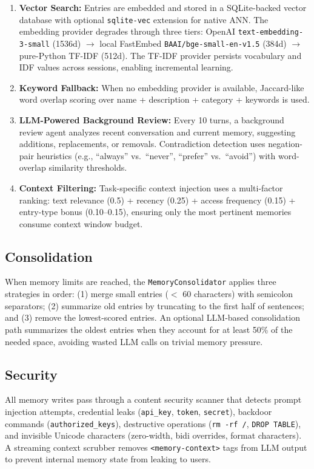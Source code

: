 \begin{enumerate}[leftmargin=*,itemsep=1pt]
    \item \textbf{Vector Search:} Entries are embedded and stored in a SQLite-backed vector database with optional \texttt{sqlite-vec} extension for native ANN. The embedding provider degrades through three tiers: OpenAI \texttt{text-embedding-3-small} (1536d) $\rightarrow$ local FastEmbed \texttt{BAAI/bge-small-en-v1.5} (384d) $\rightarrow$ pure-Python TF-IDF (512d). The TF-IDF provider persists vocabulary and IDF values across sessions, enabling incremental learning.
    \item \textbf{Keyword Fallback:} When no embedding provider is available, Jaccard-like word overlap scoring over name + description + category + keywords is used.
    \item \textbf{LLM-Powered Background Review:} Every 10 turns, a background review agent analyzes recent conversation and current memory, suggesting additions, replacements, or removals. Contradiction detection uses negation-pair heuristics (e.g., ``always'' vs.\ ``never'', ``prefer'' vs.\ ``avoid'') with word-overlap similarity thresholds.
    \item \textbf{Context Filtering:} Task-specific context injection uses a multi-factor ranking: text relevance (0.5) + recency (0.25) + access frequency (0.15) + entry-type bonus (0.10--0.15), ensuring only the most pertinent memories consume context window budget.
\end{enumerate}

\subsection{Consolidation}

When memory limits are reached, the \texttt{MemoryConsolidator} applies three strategies in order: (1) merge small entries ($<$ 60 characters) with semicolon separators; (2) summarize old entries by truncating to the first half of sentences; and (3) remove the lowest-scored entries. An optional LLM-based consolidation path summarizes the oldest entries when they account for at least 50\% of the needed space, avoiding wasted LLM calls on trivial memory pressure.

\subsection{Security}

All memory writes pass through a content security scanner that detects prompt injection attempts, credential leaks (\texttt{api\_key}, \texttt{token}, \texttt{secret}), backdoor commands (\texttt{authorized\_keys}), destructive operations (\texttt{rm -rf /}, \texttt{DROP TABLE}), and invisible Unicode characters (zero-width, bidi overrides, format characters). A streaming context scrubber removes \texttt{<memory-context>} tags from LLM output to prevent internal memory state from leaking to users.

